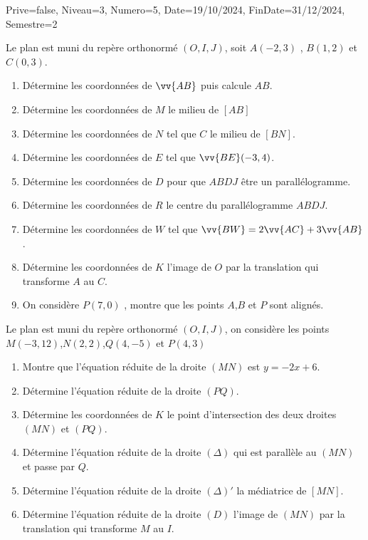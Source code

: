 \documentclass[a4paper,12pt]{article}
\begin{document}
\begin{Maquette}[DM]{Prive=false, Niveau=3, Numero=5, Date=19/10/2024, FinDate=31/12/2024, Semestre=2}

\begin{exercice}
Le plan est muni du repère orthonormé  $(O,I,J)$, soit $A(-2,3)$ , $B(1,2)$ et $C(0,3)$.
\begin{enumerate}
\item Détermine les coordonnées de $\vv{AB}$ puis calcule $AB$.
\item Détermine les coordonnées de $M$ le milieu de $[AB]$
\item Détermine les coordonnées de $N$ tel que $C$ le milieu de $[BN]$.
\item Détermine les coordonnées de $E$ tel que $\vv{BE}(-3,4)$.
\item Détermine les coordonnées de $D$ pour que $ABDJ$ être un parallélogramme.
\item Détermine les coordonnées de $R$ le centre du parallélogramme $ABDJ$.
\item Détermine les coordonnées de $W$ tel que $\vv{BW}=2\vv{AC}+3\vv{AB}$.
\item Détermine les coordonnées de $K$ l'image de $O$ par la translation qui transforme $A$ au $C$.
\item On considère $P(7,0)$ , montre que les points $A$,$B$ et $P$ sont alignés.
\end{enumerate}
\end{exercice}

\begin{exercice}
Le plan est muni du repère orthonormé  $(O,I,J)$, on considère les points $M(-3,12)$,$N(2,2)$,$Q(4,-5)$ et $P(4,3)$
\begin{enumerate}
\item Montre que l'équation réduite de la droite $(MN)$ est $y=-2x+6$.
\item Détermine l'équation réduite de la droite $(PQ)$.
\item Détermine les coordonnées de $K$ le point d'intersection des deux droites $(MN)$ et $(PQ)$.
\item Détermine l'équation réduite de la droite $(\Delta)$ qui est parallèle au $(MN)$ et passe par $Q$.
\item Détermine l'équation réduite de la droite $(\Delta)'$ la médiatrice de $[MN]$.
\item Détermine l'équation réduite de la droite $(D)$ l'image de $(MN)$ par la translation qui transforme  $M$ au $I$.
\end{enumerate}
\end{exercice}


\end{Maquette}
\end{document}
